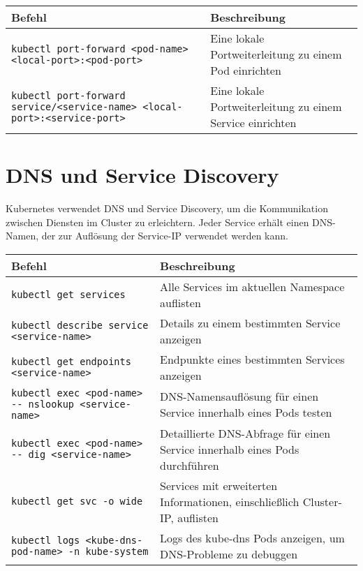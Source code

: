 \noindent
\begin{tabular}{|p{}|p{}|}
\hline
\textbf{Befehl} & \textbf{Beschreibung} \\
\hline
\texttt{kubectl port-forward <pod-name> <local-port>:<pod-port>} & Eine lokale Portweiterleitung zu einem Pod einrichten \\
\texttt{kubectl port-forward service/<service-name> <local-port>:<service-port>} & Eine lokale Portweiterleitung zu einem Service einrichten \\
\hline
\end{tabular}

\section{DNS und Service Discovery}
Kubernetes verwendet DNS und Service Discovery, um die Kommunikation zwischen Diensten im Cluster zu erleichtern. Jeder Service erhält einen DNS-Namen, der zur Auflösung der Service-IP verwendet werden kann. \\

\noindent
\begin{tabular}{|p{}|p{}|}
\hline
\textbf{Befehl} & \textbf{Beschreibung} \\
\hline
\texttt{kubectl get services} & Alle Services im aktuellen Namespace auflisten \\
\texttt{kubectl describe service <service-name>} & Details zu einem bestimmten Service anzeigen \\
\texttt{kubectl get endpoints <service-name>} & Endpunkte eines bestimmten Services anzeigen \\
\texttt{kubectl exec <pod-name> {-}{-} nslookup <service-name>} & DNS-Namensauflösung für einen Service innerhalb eines Pods testen \\
\texttt{kubectl exec <pod-name> {-}{-} dig <service-name>} & Detaillierte DNS-Abfrage für einen Service innerhalb eines Pods durchführen \\
\texttt{kubectl get svc -o wide} & Services mit erweiterten Informationen, einschließlich Cluster-IP, auflisten \\
\texttt{kubectl logs <kube-dns-pod-name> -n kube-system} & Logs des kube-dns Pods anzeigen, um DNS-Probleme zu debuggen \\
\hline
\end{tabular}
